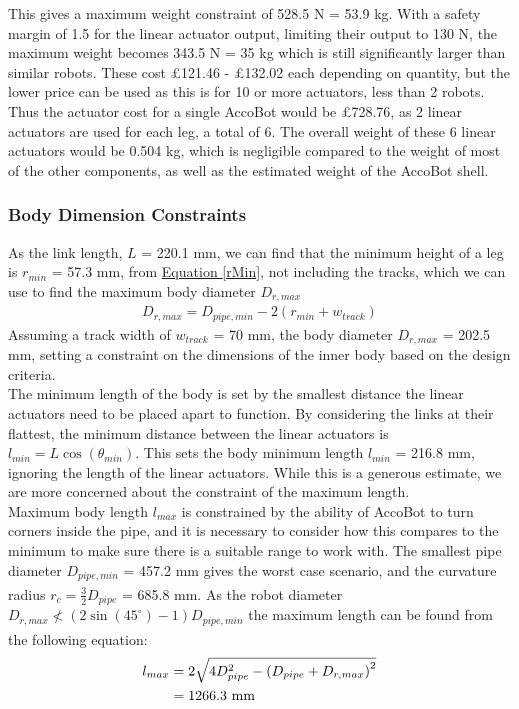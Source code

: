 \documentclass[11pt]{article}		%
\newcommand{\supercite}[1]{\textsuperscript{\cite{#1}}}		%
\newcommand{\equationref}[1]{\hyperref[#1]{Equation \ref*{#1}}}     %
\begin{document}
				This gives a maximum weight constraint of 528.5 N = 53.9 kg.
				With a safety margin of 1.5 for the linear actuator output, limiting their output to 130 N, the maximum weight becomes 343.5 N = 35 kg which is still significantly larger than similar robots.
				These cost £121.46 - £132.02 each depending on quantity, but the lower price can be used as this is for 10 or more actuators, less than 2 robots.
				Thus the actuator cost for a single AccoBot would be £728.76, as 2 linear actuators are used for each leg, a total of 6.
				The overall weight of these 6 linear actuators would be 0.504 kg, which is negligible compared to the weight of most of the other components, as well as the estimated weight of the AccoBot shell.
				
			\subsubsection{Body Dimension Constraints}
			
    		    As the link length, $L$ = 220.1 mm, we can find that the minimum height of a leg is $r_{min}$ = 57.3 mm, from \equationref{rMin}, not including the tracks, which we can use to find the maximum body diameter $D_{r,max}$
    			\begin{align}
    				D_{r,max} = D_{pipe,min} - 2 \left(r_{min} + w_{track} \right)
    			\end{align}
    			Assuming a track width of $w_{track}$ = 70 mm, the body diameter $D_{r,max}$ = 202.5 mm, setting a constraint on the dimensions of the inner body based on the design criteria.
    			\\
                \hspace*{3ex}The minimum length of the body is set by the smallest distance the linear actuators need to be placed apart to function.
    			By considering the links at their flattest, the minimum distance between the linear actuators is $l_{min} = L \cos \left( \theta_{min} \right)$.
    			This sets the body minimum length $l_{min}$ =  216.8 mm, ignoring the length of the linear actuators.
    			While this is a generous estimate, we are more concerned about the constraint of the maximum length.
    			\\
                \hspace*{3ex}Maximum body length $l_{max}$ is constrained by the ability of AccoBot to turn corners inside the pipe, and it is necessary to consider how this compares to the minimum to make sure there is a suitable range to work with.
    			The smallest pipe diameter $D_{pipe,min}$ = 457.2 mm gives the worst case scenario, and the curvature radius $r_c = \frac{3}{2} D_{pipe}$\supercite{roh2005differential} = 685.8 mm.
    			As the robot diameter $D_{r,max} \nless \left( 2 \sin \left( 45^\circ \right) - 1 \right) D_{pipe,min}$ the maximum length can be found from the following equation\supercite{roh2005differential}:
    			\begin{align}
    				l_{max} &= 2 \sqrt{4D_{pipe}^2 - \left( D_{pipe} + D_{r,max}\right) ^ 2}
    				\\
    				&= 1266.3 \ \mathrm{mm} \notag
    			\end{align}
			
\end{document}
